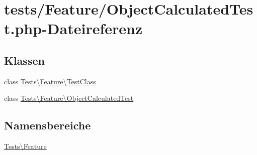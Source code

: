 \hypertarget{ObjectCalculatedTest_8php}{}\section{tests/\+Feature/\+Object\+Calculated\+Test.php-\/\+Dateireferenz}
\label{ObjectCalculatedTest_8php}
\subsection*{Klassen}
\begin{DoxyCompactItemize}
\item 
class \hyperlink{classTests_1_1Feature_1_1TestClass}{Tests\textbackslash{}\+Feature\textbackslash{}\+Test\+Class}
\item 
class \hyperlink{classTests_1_1Feature_1_1ObjectCalculatedTest}{Tests\textbackslash{}\+Feature\textbackslash{}\+Object\+Calculated\+Test}
\end{DoxyCompactItemize}
\subsection*{Namensbereiche}
\begin{DoxyCompactItemize}
\item 
 \hyperlink{namespaceTests_1_1Feature}{Tests\textbackslash{}\+Feature}
\end{DoxyCompactItemize}
